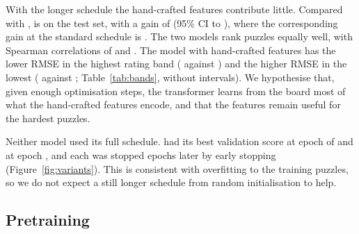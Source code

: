 \documentclass[11pt]{article}
\begin{document}
With the longer schedule the hand-crafted features contribute little.
Compared with ,
 is
 on the
test set, with a gain of
 (95\% CI
 to
),
where the corresponding gain at the standard schedule is
. The two models
rank puzzles equally well, with Spearman correlations of
 and
. The model with hand-crafted
features has the lower RMSE in the highest rating band
( against
) and the higher RMSE in the lowest
( against
; Table~\ref{tab:bands}, without
intervals). We hypothesise that, given enough optimisation steps, the
transformer learns from the board most of what the hand-crafted features
encode, and that the features remain useful for the hardest puzzles.

Neither model used its full schedule.  had its
best validation score at epoch  of
 and
 at epoch
, and each was stopped
 epochs later by early stopping
(Figure~\ref{fig:variants}). This is consistent with overfitting to the
training puzzles, so we do not expect a still longer schedule from random
initialisation to help.
\fi

\ifchangestart
\subsection{Pretraining}
\end{document}
